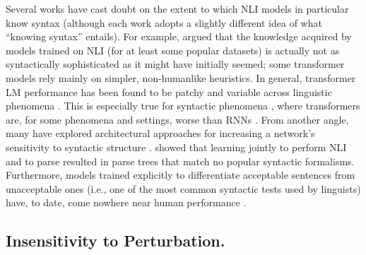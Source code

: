 \documentclass[letterpaper, 12pt]{report}
\begin{document}
Several works have cast doubt on the extent to which NLI models in particular know syntax (although each work adopts a slightly different idea of what ``knowing syntax'' entails). For example, \cite{mccoy-etal-2019-right} argued that the knowledge acquired by models trained on NLI (for at least some popular datasets) is actually not as syntactically sophisticated as it might have initially seemed; some transformer models rely mainly on simpler, non-humanlike heuristics. In general, transformer LM performance has been found to be patchy and variable across linguistic phenomena \citep{dasgupta-etal-2018-evaluating, naik-etal-2018-stress, an-etal-2019-representation, ravichander-etal-2019-equate, jeretic-etal-2020-natural}. This is especially true for syntactic phenomena \citep{marvin-linzen-2018-targeted, hu-etal-2020-systematic, gauthier-etal-2020-syntaxgym, mccoy-etal-2020-berts, warstadt-etal-2020-blimp}, where transformers are, for some phenomena and settings, worse than RNNs \citep{van-schijndel-etal-2019-quantity}. From another angle, many have explored architectural approaches for increasing a network's sensitivity to syntactic structure \citep{chen-etal-2017-enhanced, Li-etal-2020-SANLI}. \cite{williams-etal-2018-latent} showed that learning jointly to perform NLI  and to parse resulted in parse trees that match no popular syntactic formalisms. Furthermore, models trained explicitly to differentiate acceptable sentences from unacceptable ones (i.e., one of the most common syntactic tests used by linguists) have, to date, come nowhere near human performance \citep{warstadt-etal-2019-neural}.

\subsection{Insensitivity to Perturbation.}
\end{document}
